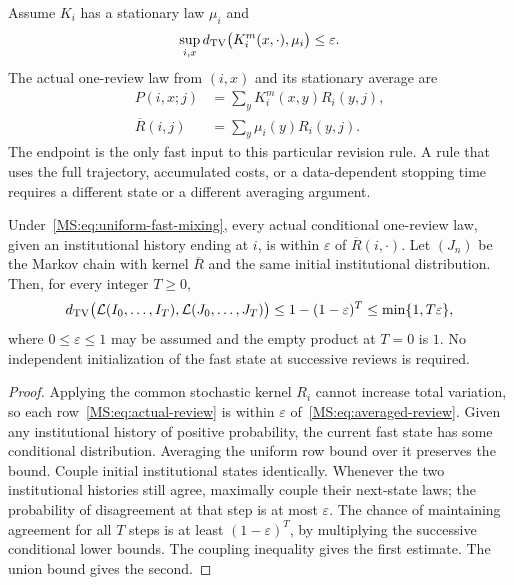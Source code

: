 Assume $K_i$ has a stationary law $\mu_i$ and
\begin{equation}\label{MS:eq:uniform-fast-mixing}
\sup_{i,x}d_{\mathrm{TV}}\bigl(K_i^m(x,\cdot),\mu_i\bigr)\leq\varepsilon.
\end{equation}
The actual one-review law from $(i,x)$ and its stationary average are
\begin{align}
P(i,x;j)&=\sum_y K_i^m(x,y)R_i(y,j),\label{MS:eq:actual-review}\\
\overline R(i,j)&=\sum_y\mu_i(y)R_i(y,j).\label{MS:eq:averaged-review}
\end{align}
The endpoint is the only fast input to this particular revision rule. A rule that uses the full trajectory, accumulated costs, or a data-dependent stopping time requires a different state or a different averaging argument.

\begin{MStheorem}\label{MS:thm:block-averaging}
Under~\eqref{MS:eq:uniform-fast-mixing}, every actual conditional one-review law, given an institutional history ending at $i$, is within $\varepsilon$ of $\overline R(i,\cdot)$. Let $(J_n)$ be the Markov chain with kernel $\overline R$ and the same initial institutional distribution. Then, for every integer $T\geq0$,
\begin{equation}\label{MS:eq:institutional-path-error}
d_{\mathrm{TV}}\bigl(\mathcal L(I_0,\ldots,I_T),\mathcal L(J_0,\ldots,J_T)\bigr)
\leq 1-(1-\varepsilon)^T\leq\min\{1,T\varepsilon\},
\end{equation}
where $0\leq\varepsilon\leq1$ may be assumed and the empty product at $T=0$ is $1$. No independent initialization of the fast state at successive reviews is required.
\end{MStheorem}
\begin{proof}
Applying the common stochastic kernel $R_i$ cannot increase total variation, so each row~\eqref{MS:eq:actual-review} is within $\varepsilon$ of~\eqref{MS:eq:averaged-review}. Given any institutional history of positive probability, the current fast state has some conditional distribution. Averaging the uniform row bound over it preserves the bound. Couple initial institutional states identically. Whenever the two institutional histories still agree, maximally couple their next-state laws; the probability of disagreement at that step is at most $\varepsilon$. The chance of maintaining agreement for all $T$ steps is at least $(1-\varepsilon)^T$, by multiplying the successive conditional lower bounds. The coupling inequality gives the first estimate. The union bound gives the second.
\end{proof}

